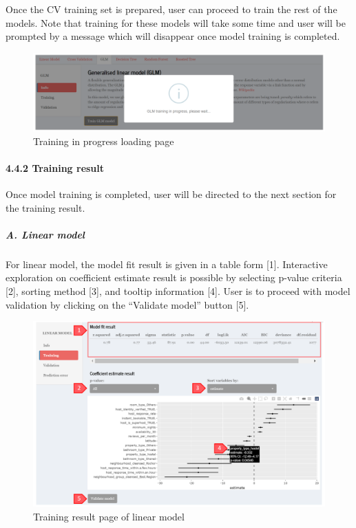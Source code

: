 \documentclass[
  12pt,
]{article}
\begin{document}
Once the CV training set is prepared, user can proceed to train the rest
of the models. Note that training for these models will take some time
and user will be prompted by a message which will disappear once model
training is completed.

\begin{figure}[H]

{\centering \includegraphics[width=0.95\linewidth]{images/mdltrain2} 

}

\caption{Training in progress loading page}\label{fig:unnamed-chunk-27}
\end{figure}

\hypertarget{training-result}{%
\paragraph{4.4.2 Training result}\label{training-result}}

Once model training is completed, user will be directed to the next
section for the training result.

\hypertarget{a.-linear-model}{%
\subparagraph{A. Linear model}\label{a.-linear-model}}

For linear model, the model fit result is given in a table form {[}1{]}.
Interactive exploration on coefficient estimate result is possible by
selecting p-value criteria {[}2{]}, sorting method {[}3{]}, and tooltip
information {[}4{]}. User is to proceed with model validation by
clicking on the ``Validate model'' button {[}5{]}.

\begin{figure}[H]

{\centering \includegraphics[width=0.95\linewidth]{images/mdltrain3} 

}

\caption{Training result page of linear model}\label{fig:unnamed-chunk-28}
\end{figure}
\end{document}
